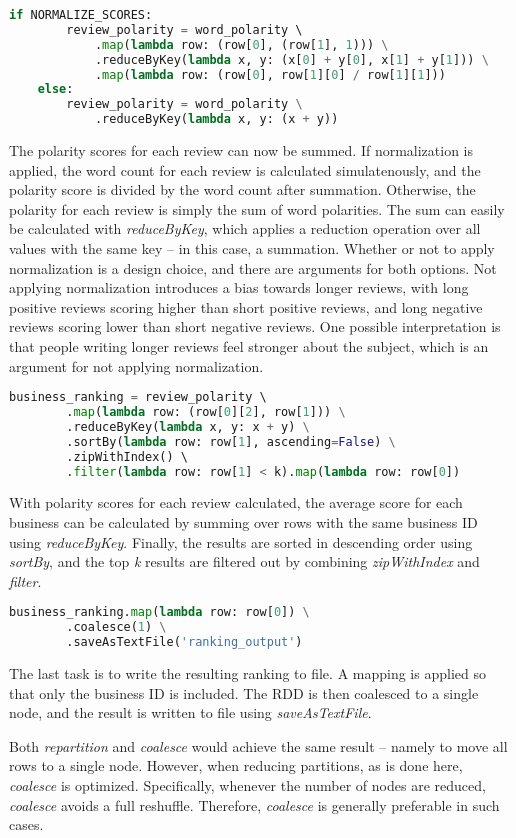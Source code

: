 \documentclass[a4paper]{article}
\begin{document}
\begin{lstlisting}[language=python]
    if NORMALIZE_SCORES:
        review_polarity = word_polarity \ 
            .map(lambda row: (row[0], (row[1], 1))) \
            .reduceByKey(lambda x, y: (x[0] + y[0], x[1] + y[1])) \
            .map(lambda row: (row[0], row[1][0] / row[1][1]))
    else:
        review_polarity = word_polarity \
            .reduceByKey(lambda x, y: (x + y))
\end{lstlisting}

The polarity scores for each review can now be summed. If normalization is applied, the word count for each review is calculated simulatenously, and the polarity score is divided by the word count after summation. Otherwise, the polarity for each review is simply the sum of word polarities. The sum can easily be calculated with \emph{reduceByKey}, which applies a reduction operation over all values with the same key -- in this case, a summation. Whether or not to apply normalization is a design choice, and there are arguments for both options. Not applying normalization introduces a bias towards longer reviews, with long positive reviews scoring higher than short positive reviews, and long negative reviews scoring lower than short negative reviews. One possible interpretation is that people writing longer reviews feel stronger about the subject, which is an argument for not applying normalization.

\begin{lstlisting}[language=python]
    business_ranking = review_polarity \ 
        .map(lambda row: (row[0][2], row[1])) \
        .reduceByKey(lambda x, y: x + y) \
        .sortBy(lambda row: row[1], ascending=False) \
        .zipWithIndex() \ 
        .filter(lambda row: row[1] < k).map(lambda row: row[0])
\end{lstlisting}

With polarity scores for each review calculated, the average score for each business can be calculated by summing over rows with the same business ID using \emph{reduceByKey}. Finally, the results are sorted in descending order using \emph{sortBy}, and the top \emph{k} results are filtered out by combining \emph{zipWithIndex} and \emph{filter}.

\begin{lstlisting}[language=python]
    business_ranking.map(lambda row: row[0]) \
        .coalesce(1) \
        .saveAsTextFile('ranking_output')
\end{lstlisting}

The last task is to write the resulting ranking to file. A mapping is applied so that only the business ID is included. The RDD is then coalesced to a single node, and the result is written to file using \emph{saveAsTextFile}.

Both \emph{repartition} and \emph{coalesce} would achieve the same result -- namely to move all rows to a single node. However, when reducing partitions, as is done here, \emph{coalesce} is optimized. Specifically, whenever the number of nodes are reduced, \emph{coalesce} avoids a full reshuffle. Therefore, \emph{coalesce} is generally preferable in such cases.
\end{document}
